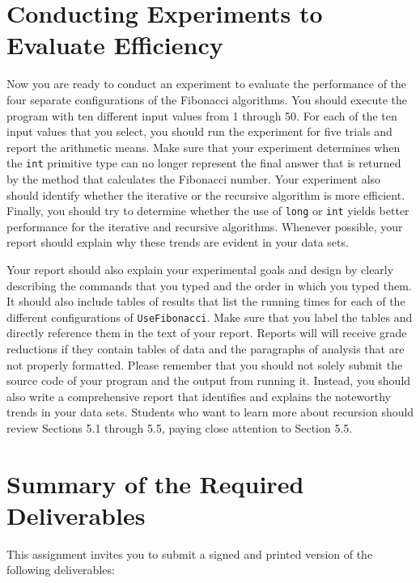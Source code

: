 \vspace*{-.05in}
\section*{Conducting Experiments to Evaluate Efficiency}
\vspace*{-.05in}

Now you are ready to conduct an experiment to evaluate the performance of the four separate configurations of the
Fibonacci algorithms. You should execute the program with ten different input values from 1 through 50. For each of the
ten input values that you select, you should run the experiment for five trials and report the arithmetic means. Make
sure that your experiment determines when the {\tt int} primitive type can no longer represent the final answer that is
returned by the method that calculates the Fibonacci number. Your experiment also should identify whether the iterative
or the recursive algorithm is more efficient.  Finally, you should try to determine whether the use of {\tt long} or
{\tt int} yields better performance for the iterative and recursive algorithms. Whenever possible, your report should
explain why these trends are evident in your data sets.

Your report should also explain your experimental goals and design by clearly describing the commands that you typed and
the order in which you typed them. It should also include tables of results that list the running times for each of the
different configurations of {\tt UseFibonacci}.  Make sure that you label the tables and directly reference them in the
text of your report. Reports will will receive grade reductions if they contain tables of data and the paragraphs of
analysis that are not properly formatted. Please remember that you should not solely submit the source code of your
program and the output from running it. Instead, you should also write a comprehensive report that identifies and
explains the noteworthy trends in your data sets. Students who want to learn more about recursion should review
Sections 5.1 through 5.5, paying close attention to Section 5.5.

\section*{Summary of the Required Deliverables}

This assignment invites you to submit a signed and printed version of the following deliverables:

